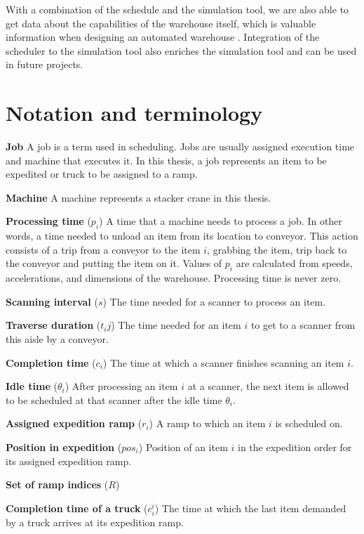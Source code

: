 \documentclass{ctuthesis}
\begin{document}
With a combination of the schedule and the simulation tool, we are also able to get data about the capabilities of the warehouse itself, which is valuable information when designing an automated warehouse \cite{review}. Integration of the scheduler to the simulation tool also enriches the simulation tool and can be used in future projects.


\section{Notation and terminology}

\noindent \textbf{Job} A job is a term used in scheduling. Jobs are usually assigned execution time and machine that executes it. In this thesis, a job represents an item to be expedited or truck to be assigned to a ramp. 

\noindent \textbf{Machine} A machine represents a stacker crane in this thesis.

\noindent \textbf{Processing time} ($p_i$) A time that a machine needs to process a job. In other words, a time needed to unload an item from its location to conveyor. This action consists of a trip from a conveyor to the item $i$, grabbing the item, trip back to the conveyor and putting the item on it. Values of $p_i$ are calculated from speeds, accelerations, and dimensions of the warehouse. Processing time is never zero.

\noindent \textbf{Scanning interval} ($s$) The time needed for a scanner to process an item.

\noindent \textbf{Traverse duration} ($t_ij$) The time needed for an item $i$ to get to a scanner from this aisle by a conveyor.

\noindent \textbf{Completion time} ($c_i$) The time at which a scanner finishes scanning an item $i$.

\noindent \textbf{Idle time} ($\theta_i$) After processing an item $i$ at a scanner, the next item is allowed to be scheduled at that scanner after the idle time $\theta_i$.

\noindent \textbf{Assigned expedition ramp} ($r_i$) A ramp to which an item $i$ is scheduled on.

\noindent \textbf{Position in expedition} ($pos_i$) Position of an item $i$ in the expedition order for its assigned expedition ramp.

\noindent \textbf{Set of ramp indices} ($R$) 

\noindent \textbf{Completion time of a truck} ($c_i^i$) The time at which the last item demanded by a truck arrives at its expedition ramp.
\end{document}
